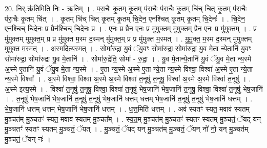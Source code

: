 \documentclass[17pt]{extarticle}
\begin{document}
20. निर्.ऋ॑ति॒मिति॒ निः - ऋ॒ति॒म् । . प॒रा॒चैः कृ॒तम् कृ॒तम् प॑रा॒चैः प॑रा॒चैः कृ॒तम् चि॑च् चित् कृ॒तम् प॑रा॒चैः प॑रा॒चैः कृ॒तम् चि॑त् । . कृ॒तम् चि॑च् चित् कृ॒तम् कृ॒तम् चि॒देन॒ एन॑श्चित् कृ॒तम् कृ॒तम् चि॒देनः॑ । . चि॒देन॒ एन॑श्चिच् चि॒देनः॒ प्र प्रैन॑श्चिच् चि॒देनः॒ प्र । . एनः॒ प्र प्रैन॒ एनः॒ प्र मु॑मुक्तम् मुमुक्त॒म् प्रैन॒ एनः॒ प्र मु॑मुक्तम् । . प्र मु॑मुक्तम् मुमुक्त॒म् प्र प्र मु॑मुक्त म॒स्म द॒स्मन् मु॑मुक्त॒म् प्र प्र मु॑मुक्त म॒स्मत् । . मु॒मु॒क्त॒ म॒स्म द॒स्मन् मु॑मुक्तम् मुमुक्त म॒स्मत् । . अ॒स्मदित्य॒स्मत् । . सोमा॑रुद्रा यु॒वं ॅयु॒वꣳ सोमा॑रुद्रा॒ सोमा॑रुद्रा यु॒व मे॒ता न्ये॒तानि॑ यु॒वꣳ सोमा॑रुद्रा॒ सोमा॑रुद्रा यु॒व मे॒तानि॑ । . सोमा॑रु॒द्रेति॒ सोमा᳚ - रु॒द्रा॒ । . यु॒व मे॒तान्ये॒तानि॑ यु॒वं ॅयु॒व मे॒ता न्य॒स्मे अ॒स्मे ए॒तानि॑ यु॒वं ॅयु॒व मे॒ता न्य॒स्मे । . ए॒ता न्य॒स्मे अ॒स्मे ए॒ता न्ये॒ता न्य॒स्मे विश्वा॒ विश्वा॑ अ॒स्मे ए॒ता न्ये॒ता न्य॒स्मे विश्वा᳚ । . अ॒स्मे विश्वा॒ विश्वा॑ अ॒स्मे अ॒स्मे विश्वा॑ त॒नूषु॑ त॒नूषु॒ विश्वा॑ अ॒स्मे अ॒स्मे विश्वा॑ त॒नूषु॑ । . अ॒स्मे इत्य॒स्मे । . विश्वा॑ त॒नूषु॑ त॒नूषु॒ विश्वा॒ विश्वा॑ त॒नूषु॑ भेष॒जानि॑ भेष॒जानि॑ त॒नूषु॒ विश्वा॒ विश्वा॑ त॒नूषु॑ भेष॒जानि॑ । . त॒नूषु॑ भेष॒जानि॑ भेष॒जानि॑ त॒नूषु॑ त॒नूषु॑ भेष॒जानि॑ धत्तम् धत्तम् भेष॒जानि॑ त॒नूषु॑ त॒नूषु॑ भेष॒जानि॑ धत्तम् । . भे॒ष॒जानि॑ धत्तम् धत्तम् भेष॒जानि॑ भेष॒जानि॑ धत्तम् । . ध॒त्त॒मिति॑ धत्तम् । . अव॑ स्यतꣳ स्यत॒ मवाव॑ स्यतम् मु॒ञ्चत॑म् मु॒ञ्चतꣳ॑ स्यत॒ मवाव॑ स्यतम् मु॒ञ्चत᳚म् । . स्य॒त॒म् मु॒ञ्चत॑म् मु॒ञ्चतꣳ॑ स्यतꣳ स्यतम् मु॒ञ्चतं॒ ॅयद् यन् मु॒ञ्चतꣳ॑ स्यतꣳ स्यतम् मु॒ञ्चतं॒ ॅयत् । . मु॒ञ्चतं॒ ॅयद् यन् मु॒ञ्चत॑म् मु॒ञ्चतं॒ ॅयन् नो॑ नो॒ यन् मु॒ञ्चत॑म् मु॒ञ्चतं॒ ॅयन् नः॑ । \newline
\end{document}
